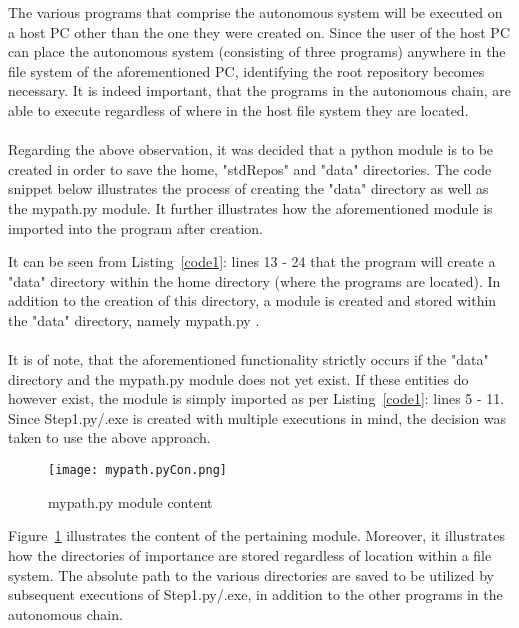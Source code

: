 The various programs that comprise the autonomous system will be executed on a host PC other than the one they were created on. Since the user of the host PC can place the autonomous system (consisting of three programs) anywhere in the file system of the aforementioned PC, identifying the root repository becomes necessary. It is indeed important, that the programs in the autonomous chain, are able to execute regardless of where in the host file system they are located. 
\\\\
Regarding the above observation, it was decided that a python module is to be created in order to save the home, "stdRepos" and "data" directories. The code snippet below illustrates the process of creating the "data" directory as well as the mypath.py module. It further illustrates how the aforementioned module is imported into the program after creation.



It can be seen from Listing~\ref{code1}: lines 13 - 24 that the program will create a "data" directory within the home directory (where the programs are located). In addition to the creation of this directory, a module is created and stored within the "data" directory, namely mypath.py \cite{Sweigart2015}.
\\\\
It is of note, that the aforementioned functionality strictly occurs if the "data" directory and the mypath.py module does not yet exist. If these entities do however exist, the module is simply imported as per  Listing~\ref{code1}: lines 5 - 11. Since Step1.py/.exe is created with multiple executions in mind, the decision was taken to use the above approach.

\begin{figure}[H]
\begin{center}
\texttt{[image: mypath.pyCon.png]}
\caption{mypath.py module content}
\label{mypath.pyCon}
\end{center}
\end{figure}

Figure~\ref{mypath.pyCon} illustrates the content of the pertaining module. Moreover, it illustrates how the directories of importance are stored regardless of location within a file system. The absolute path to the various directories are saved to be utilized by subsequent executions of Step1.py/.exe, in addition to the other programs in the autonomous chain.


